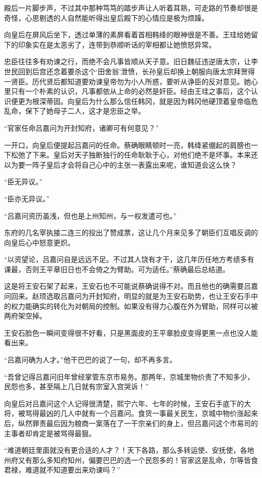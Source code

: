 殿后一片脚步声，不过其中那种笃笃的踏步声让人听着耳熟，可走路的节奏却很是奇怪，心思剔透的人自然能听得出皇后殿下的心情应是极为烦躁。

向皇后在屏风后坐下，透过单薄的素屏看着首相韩绛的眼神很是不善。王珪给她留下的印象实在是太恶劣了，连带到恭顺听话的宰相都让她愤怒异常。

忠臣往往多有劝谏之行，而绝不会凡事皆顺从天子意。旧日魏征违逆唐太宗，让李世民回到后宫还念着要杀这个‘田舍翁’泄愤，长孙皇后却换上朝服向唐太宗拜贺得一贤臣。历代贤后都知道要劝谏皇帝勿为小人所惑，要听从诤臣的反对意见。她心里只有一个朴素的认识，凡事都依从上命的必然是奸臣。经由王珪之事后，这个认识便更为根深蒂固。向皇后为什么那么信任韩冈，就是因为韩冈他硬顶着皇帝临危乱命，保下了她母子二人，这才是忠臣之举。

“官家任命吕嘉问为开封知府，诸卿可有何意见？”

一开口，向皇后便提起吕嘉问的任命。蔡确眼睛顿时一亮，韩绛紧绷起的肩膀也一下松弛了下来。皇后对天子独断独行的任命耿耿于心，对他们绝不是坏事。本来还以为要一阵子皇后才会将自己心中的主张一表露出来呢，谁知道会这么快？

“臣无异议。”

“臣亦无异议。”

“吕嘉问资历虽浅，但也是上州知州，与一权发遣可也。”

东府的几名宰执接二连三的投出了赞成票，这让几个月来见多了朝臣们互唱反调的向皇后心中怒意更炽。

“以资望论，吕嘉问自是远远不足。不过其人饶有才干，这几年历任地方考绩多有课最，否则王平章旧日也不会倚之为臂助。可为适任。”蔡确最后总结道。

这是将王安石架了起来，王安石也不可能说蔡确说得不对。而且他也的确需要吕嘉问回来。赵顼选取吕嘉问为开封知府，明显的就是为王安石助势，也让王安石手中的权力能确实的转化为对朝局的控制。如果没有得力心腹在外为臂助，同样可以被两府架空掉。

王安石脸色一瞬间变得很不好看，只是黑面皮的王平章脸皮变得更黑一点也没人能看出来。

“吕嘉问确为人才。”他干巴巴的说了一句，却不再多言。

“吾曾记得吕嘉问旧年曾经掌管东京市易务。那两年，京城里物价贵了不知多少，民怨也多，甚至隔上几日就有宗室入宫哭诉！”

向皇后对吕嘉问这个人记得很清楚，熙宁六年、七年的时候，王安石手底下的大将，被骂得最凶的几人中就有一个吕嘉问。食货一事最关民生，京城中物价涨起来后，纵然罪责最后因为粮商一案落在了一干宗亲们的身上，但吕嘉问这个市易司的主事者却肯定是被骂得最狠。

“难道朝廷里面就没有更合适的人才？！天下各路，那么多转运使、安抚使，各地州府又有那么多知府知州，偏要巴巴的选一个民怨多的！官家这是乱命，尔等皆食君禄，难道就不知道要出来劝谏吗？”

